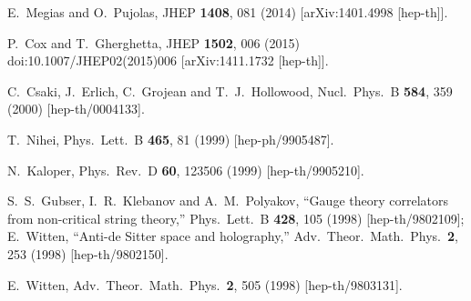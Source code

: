 \documentclass[12pt]{article}
\begin{document}
\begin{thebibliography}{99}
  
  E.~Megias and O.~Pujolas,
  JHEP {\bf 1408}, 081 (2014)
  [arXiv:1401.4998 [hep-th]].

  P.~Cox and T.~Gherghetta,
  JHEP {\bf 1502}, 006 (2015)
  doi:10.1007/JHEP02(2015)006
  [arXiv:1411.1732 [hep-th]].
  
 
  
  C.~Csaki, J.~Erlich, C.~Grojean and T.~J.~Hollowood,
  Nucl.\ Phys.\ B {\bf 584}, 359 (2000)
  [hep-th/0004133].
  
  T.~Nihei,
  Phys.\ Lett.\ B {\bf 465}, 81 (1999)
  [hep-ph/9905487].


  N.~Kaloper,
  Phys.\ Rev.\ D {\bf 60}, 123506 (1999)
  [hep-th/9905210].
  
S.~S.~Gubser, I.~R.~Klebanov and A.~M.~Polyakov,
``Gauge theory correlators from non-critical string theory,''
Phys.\ Lett.\ B {\bf 428}, 105 (1998)
[hep-th/9802109];
E.~Witten,
``Anti-de Sitter space and holography,''
Adv.\ Theor.\ Math.\ Phys.\  {\bf 2}, 253 (1998)
[hep-th/9802150].

 
  E.~Witten,
  Adv.\ Theor.\ Math.\ Phys.\  {\bf 2}, 505 (1998)
  [hep-th/9803131].




\end{thebibliography}
\end{document}
